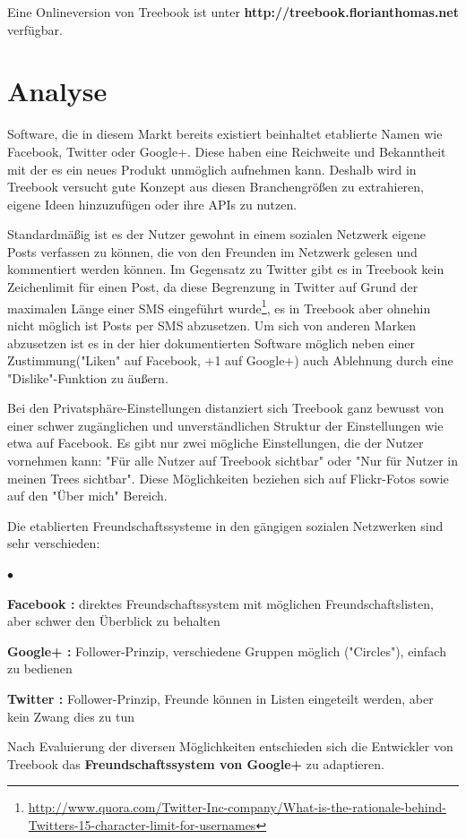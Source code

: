 \documentclass[10pt,a4paper]{book}
\begin{document}
Eine Onlineversion von Treebook ist unter \textbf{http://treebook.florianthomas.net} verfügbar.
\chapter{Analyse}
Software, die in diesem Markt bereits existiert beinhaltet etablierte Namen wie Facebook, Twitter oder Google+. Diese haben eine Reichweite und Bekanntheit mit der es ein neues Produkt unmöglich aufnehmen kann. Deshalb wird in Treebook versucht gute Konzept aus diesen Branchengrößen zu extrahieren, eigene Ideen hinzuzufügen oder ihre APIs zu nutzen.

Standardmäßig ist es der Nutzer gewohnt in einem sozialen Netzwerk eigene Posts verfassen zu können, die von den Freunden im Netzwerk gelesen und kommentiert werden können. Im Gegensatz zu Twitter gibt es in Treebook kein Zeichenlimit für einen Post, da diese Begrenzung in Twitter auf Grund der maximalen Länge einer SMS eingeführt wurde\footnote{\href{http://www.quora.com/Twitter-Inc-company/What-is-the-rationale-behind-Twitters-15-character-limit-for-usernames}{http://www.quora.com/Twitter-Inc-company/What-is-the-rationale-behind-Twitters-15-character-limit-for-usernames}}, es in Treebook aber ohnehin nicht möglich ist Posts per SMS abzusetzen.
Um sich von anderen Marken abzusetzen ist es in der hier dokumentierten Software möglich neben einer Zustimmung("Liken" auf Facebook, +1 auf Google+) auch Ablehnung durch eine "Dislike"-Funktion zu äußern.

Bei den Privatsphäre-Einstellungen distanziert sich Treebook ganz bewusst von einer schwer zugänglichen und unverständlichen Struktur der Einstellungen wie etwa auf Facebook. Es gibt nur zwei mögliche Einstellungen, die der Nutzer vornehmen kann: "Für alle Nutzer auf Treebook sichtbar" oder "Nur für Nutzer in meinen Trees sichtbar". Diese Möglichkeiten beziehen sich auf Flickr-Fotos sowie auf den "Über mich" Bereich.

Die etablierten Freundschaftssysteme in den gängigen sozialen Netzwerken sind sehr verschieden:
\begin{list}{$\bullet$}{}
\item \textbf{Facebook :} direktes Freundschaftssystem mit möglichen Freundschaftslisten, aber schwer den Überblick zu behalten
\item \textbf{Google+ :} Follower-Prinzip, verschiedene Gruppen möglich ("Circles"), einfach zu bedienen
\item \textbf{Twitter :} Follower-Prinzip, Freunde können in Listen eingeteilt werden, aber kein Zwang dies zu tun
\end{list}
Nach Evaluierung der diversen Möglichkeiten entschieden sich die Entwickler von Treebook das \textbf{Freundschaftssystem von Google+} zu adaptieren.
\end{document}
